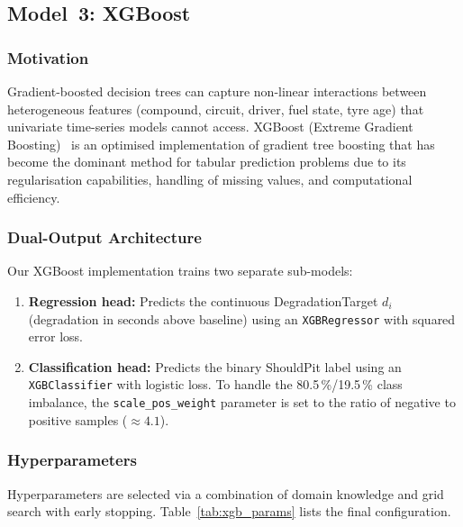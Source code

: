 \documentclass[journal,twoside]{IEEEtran}
\begin{document}
\subsection{Model~3: XGBoost}\label{sec:xgboost}

\subsubsection{Motivation}

Gradient-boosted decision trees can capture non-linear interactions
between heterogeneous features (compound, circuit, driver, fuel state,
tyre age) that univariate time-series models cannot access.  XGBoost
(Extreme Gradient Boosting)~\cite{chen2016xgboost} is an optimised
implementation of gradient tree boosting that has become the dominant
method for tabular prediction problems due to its regularisation
capabilities, handling of missing values, and computational efficiency.

\subsubsection{Dual-Output Architecture}

Our XGBoost implementation trains two separate sub-models:

\begin{enumerate}
  \item \textbf{Regression head:} Predicts the continuous
  DegradationTarget $d_i$ (degradation in seconds above baseline) using
  an \texttt{XGBRegressor} with squared error loss.

  \item \textbf{Classification head:} Predicts the binary ShouldPit
  label using an \texttt{XGBClassifier} with logistic loss.  To handle
  the 80.5\,\%/19.5\,\% class imbalance, the
  \texttt{scale\_pos\_weight} parameter is set to the ratio of negative
  to positive samples ($\approx 4.1$).
\end{enumerate}

\subsubsection{Hyperparameters}

Hyperparameters are selected via a combination of domain knowledge and
grid search with early stopping.  Table~\ref{tab:xgb_params} lists the
final configuration.
\end{document}
